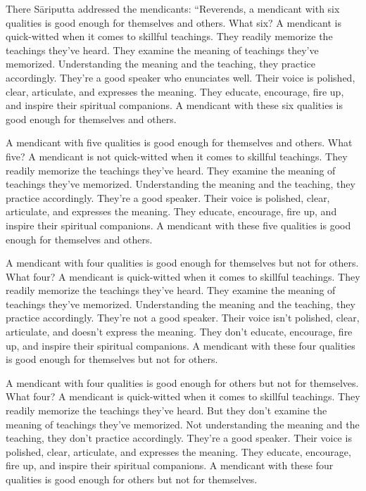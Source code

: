 \documentclass[12pt,openany]{book}%
\begin{document}
There \textsanskrit{Sāriputta} addressed the mendicants: “Reverends, a mendicant with six qualities is good enough for themselves and others. What six? A mendicant is quick-witted when it comes to skillful teachings. They readily memorize the teachings they’ve heard. They examine the meaning of teachings they’ve memorized. Understanding the meaning and the teaching, they practice accordingly. They’re a good speaker who enunciates well. Their voice is polished, clear, articulate, and expresses the meaning. They educate, encourage, fire up, and inspire their spiritual companions. A mendicant with these six qualities is good enough for themselves and others. 

A mendicant with five qualities is good enough for themselves and others. What five? A mendicant is not quick-witted when it comes to skillful teachings. They readily memorize the teachings they’ve heard. They examine the meaning of teachings they’ve memorized. Understanding the meaning and the teaching, they practice accordingly. They’re a good speaker. Their voice is polished, clear, articulate, and expresses the meaning. They educate, encourage, fire up, and inspire their spiritual companions. A mendicant with these five qualities is good enough for themselves and others. 

A mendicant with four qualities is good enough for themselves but not for others. What four? A mendicant is quick-witted when it comes to skillful teachings. They readily memorize the teachings they’ve heard. They examine the meaning of teachings they’ve memorized. Understanding the meaning and the teaching, they practice accordingly. They’re not a good speaker. Their voice isn’t polished, clear, articulate, and doesn’t express the meaning. They don’t educate, encourage, fire up, and inspire their spiritual companions. A mendicant with these four qualities is good enough for themselves but not for others. 

A mendicant with four qualities is good enough for others but not for themselves. What four? A mendicant is quick-witted when it comes to skillful teachings. They readily memorize the teachings they’ve heard. But they don’t examine the meaning of teachings they’ve memorized. Not understanding the meaning and the teaching, they don’t practice accordingly. They’re a good speaker. Their voice is polished, clear, articulate, and expresses the meaning. They educate, encourage, fire up, and inspire their spiritual companions. A mendicant with these four qualities is good enough for others but not for themselves. 
\end{document}

